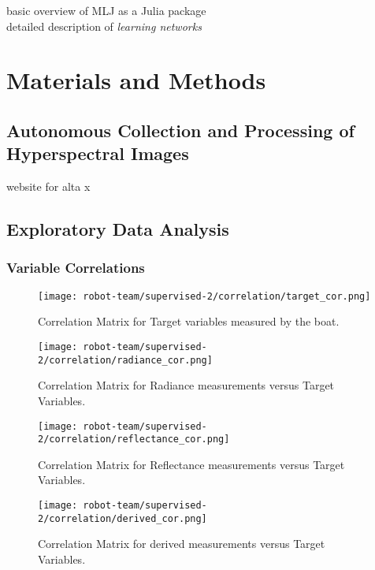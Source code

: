 basic overview of MLJ as a Julia package \cite{MLJ1}\\ 

detailed description of \textit{learning networks} \cite{MLJ2}



\section{Materials and Methods}
\subsection{Autonomous Collection and Processing of Hyperspectral Images}

website for alta x \cite{freeflyAltaX}


\subsection{Exploratory Data Analysis}
\subsubsection{Variable Correlations}

\begin{figure}[h]
\texttt{[image: robot-team/supervised-2/correlation/target\_cor.png]}
\caption{Correlation Matrix for Target variables measured by the boat.\label{target_cor}}
\end{figure}

\begin{figure}[h]
\texttt{[image: robot-team/supervised-2/correlation/radiance\_cor.png]}
\caption{Correlation Matrix for Radiance measurements versus Target Variables.\label{rad_cor}}
\end{figure}

\begin{figure}[h]
\texttt{[image: robot-team/supervised-2/correlation/reflectance\_cor.png]}
\caption{Correlation Matrix for Reflectance measurements versus Target Variables.\label{ref_cor}}
\end{figure}

\begin{figure}[h]
\texttt{[image: robot-team/supervised-2/correlation/derived\_cor.png]}
\caption{Correlation Matrix for derived measurements versus Target Variables.\label{derived_cor}}
\end{figure}



